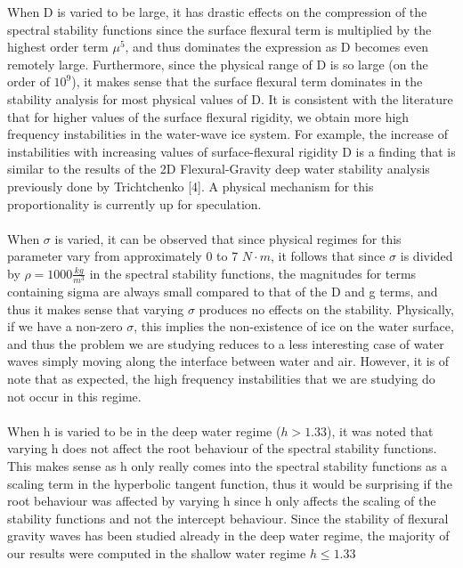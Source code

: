 \documentclass{article}
\begin{document}
When D is varied to be large, it has drastic effects on the compression of the spectral stability functions since the surface flexural term is multiplied by the highest order term \(\mu ^ 5\), and thus dominates the expression as D becomes even remotely large. Furthermore, since the physical range of D is so large (on the order of \(10^9\)), it makes sense that the surface flexural term dominates in the stability analysis for most physical values of D. It is consistent with the literature that for higher values of the surface flexural rigidity, we obtain more high frequency instabilities in the water-wave ice system. For example, the increase of instabilities with increasing values of surface-flexural rigidity D is a finding that is similar to the results of the 2D Flexural-Gravity deep water stability analysis previously done by Trichtchenko [4]. A physical mechanism for this proportionality is currently up for speculation. 
\\
\\


When \(\sigma\) is varied, it can be observed that since physical regimes for this parameter vary from approximately 0 to 7 \(N \cdot m\), it follows that since \(\sigma\) is divided by \(\rho = 1000 \frac{kg}{m^3}\) in the spectral stability functions, the magnitudes for terms containing sigma are always small compared to that of the D and g terms, and thus it makes sense that varying \(\sigma\) produces no effects on the stability. Physically, if we have a non-zero \(\sigma\), this implies the non-existence of ice on the water surface, and thus the problem we are studying reduces to a less interesting case of water waves simply moving along the interface between water and air. However, it is of note that as expected, the high frequency instabilities that we are studying do not occur in this regime. 
\\
\\

When h is varied to be in the deep water regime (\(h > 1.33\)), it was noted that varying h does not affect the root behaviour of the spectral stability functions. This makes sense as h only really comes into the spectral stability functions as a scaling term in the hyperbolic tangent function, thus it would be surprising if the root behaviour was affected by varying h since h only affects the scaling of the stability functions and not the intercept behaviour. Since the stability of flexural gravity waves has been studied already in the deep water regime, the majority of our results were computed in the shallow water regime \(h \leq 1.33\) 
\\
\\
\end{document}
